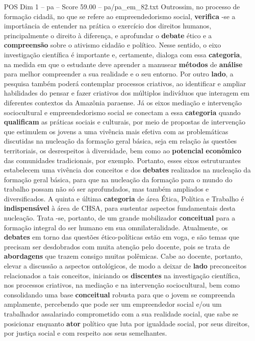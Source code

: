 \begin{textsample}{POS Dim 1 – pa – Score 59.00 – pa/pa\_em\_82.txt}
Outrossim, no processo de formação cidadã, no que se refere ao empreendedorismo social, \textbf{verifica} -se a importância de entender na prática o exercício dos direitos humanos, principalmente o direito à diferença, e aprofundar o \textbf{debate} ético e a \textbf{compreensão} sobre o ativismo cidadão e político.
Nesse sentido, o eixo investigação científica é importante e, certamente, dialoga com essa \textbf{categoria}, na medida em que o estudante deve aprender a manusear \textbf{métodos} de \textbf{análise} para melhor compreender a sua realidade e o seu entorno.
Por outro \textbf{lado}, a pesquisa também poderá contemplar processos criativos, ao identificar e ampliar habilidades do pensar e fazer criativos dos múltiplos indivíduos que interagem em diferentes contextos da Amazônia paraense.
Já os eixos mediação e intervenção sociocultural e empreendedorismo social se conectam a essa \textbf{categoria} quando \textbf{qualificam} as práticas sociais e culturais, por meio de propostas de intervenção que estimulem os jovens a uma vivência mais efetiva com as problemáticas discutidas na nucleação da formação geral básica, seja em relação às questões territoriais, os desrespeitos à diversidade, bem como ao \textbf{potencial} \textbf{econômico} das comunidades tradicionais, por exemplo.
Portanto, esses eixos estruturantes estabelecem uma vivência dos conceitos e dos \textbf{debates} realizados na nucleação da formação geral básica, para que na nucleação da formação para o mundo do trabalho possam não só ser aprofundados, mas também ampliados e diversificados.
A quinta e última \textbf{categoria} de área Ética, Política e Trabalho é \textbf{indispensável} à área de CHSA, para sustentar aspectos fundamentais desta nucleação.
Trata -se, portanto, de um grande mobilizador \textbf{conceitual} para a formação integral do ser humano em sua omnilateralidade.
Atualmente, os \textbf{debates} em torno das questões ético-políticas estão em voga, e são temas que precisam ser desdobrados com muita atenção pelo docente, pois se trata de \textbf{abordagens} que trazem consigo muitas polêmicas.
Cabe ao docente, portanto, elevar a discussão a aspectos ontológicos, de modo a deixar de \textbf{lado} preconceitos relacionados a tais conceitos, iniciando os \textbf{discentes} na investigação científica, nos processos criativos, na mediação e na intervenção sociocultural, bem como consolidando uma base \textbf{conceitual} robusta para que o jovem se compreenda amplamente, percebendo que pode ser um empreendedor social e/ou um trabalhador assalariado comprometido com a sua realidade social, que sabe se posicionar enquanto \textbf{ator} político que luta por igualdade social, por seus direitos, por justiça social e com respeito aos seus semelhantes.

\end{textsample}
